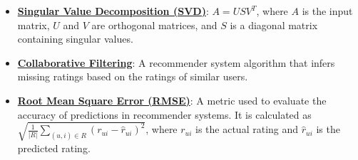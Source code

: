 \documentclass{article}%
\begin{document}
\begin{itemize}[leftmargin=*]%
\item \href{https://purdue.brightspace.com/d2l/common/assets/pdfjs-d2l-dist/1.0.14-legacy/web/viewer.html?file=\%2Fcontent\%2Fenforced\%2F1095465-WL.202510.CS24200.LE1\%2F242-19-svd-pca.pdf\%3Fou\%3D1095465\&lang=en-us\&container=d2l-fileviewer-rendered-pdf\&fullscreen=d2l-fileviewer-rendered-pdf-dialog\&height=667#page=10}{\textbf{Singular Value Decomposition (SVD)}}: $A = USV^T$, where $A$ is the input matrix, $U$ and $V$ are orthogonal matrices, and $S$ is a diagonal matrix containing singular values.%
\item \href{https://purdue.brightspace.com/d2l/common/assets/pdfjs-d2l-dist/1.0.14-legacy/web/viewer.html?file=\%2Fcontent\%2Fenforced\%2F1095465-WL.202510.CS24200.LE1\%2F242-19-svd-pca.pdf\%3Fou\%3D1095465\&lang=en-us\&container=d2l-fileviewer-rendered-pdf\&fullscreen=d2l-fileviewer-rendered-pdf-dialog\&height=667#page=29}{\textbf{Collaborative Filtering}}: A recommender system algorithm that infers missing ratings based on the ratings of similar users.%
\item \href{https://purdue.brightspace.com/d2l/common/assets/pdfjs-d2l-dist/1.0.14-legacy/web/viewer.html?file=\%2Fcontent\%2Fenforced\%2F1095465-WL.202510.CS24200.LE1\%2F242-19-svd-pca.pdf\%3Fou\%3D1095465\&lang=en-us\&container=d2l-fileviewer-rendered-pdf\&fullscreen=d2l-fileviewer-rendered-pdf-dialog\&height=667#page=45}{\textbf{Root Mean Square Error (RMSE)}}: A metric used to evaluate the accuracy of predictions in recommender systems. It is calculated as $\sqrt{\frac{1}{|R|} \sum_{(u,i) \in R} (r_{ui} - \hat{r}_{ui})^2}$, where $r_{ui}$ is the actual rating and $\hat{r}_{ui}$ is the predicted rating.%
\end{itemize}%
\end{document}
